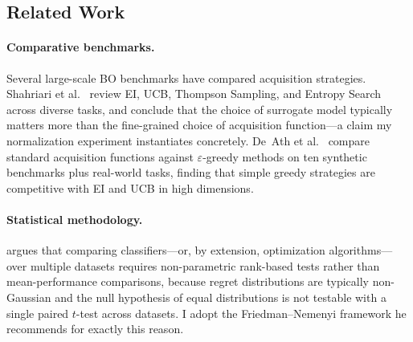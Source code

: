\subsection{Related Work}
\label{sec:related}

\paragraph{Comparative benchmarks.}
Several large-scale BO benchmarks have compared acquisition strategies.
Shahriari et al.~\citeyear{shahriari2016taking} review EI, UCB,
Thompson Sampling, and Entropy Search across diverse tasks, and conclude
that the choice of surrogate model typically matters more than the
fine-grained choice of acquisition function—a claim my normalization
experiment instantiates concretely.
De~Ath et al.~\citeyear{deAth2019greed} compare standard acquisition
functions against $\varepsilon$-greedy methods on ten synthetic benchmarks plus
real-world tasks, finding that simple greedy strategies are competitive
with EI and UCB in high dimensions.

\paragraph{Statistical methodology.}
 argues that comparing classifiers—or, by
extension, optimization algorithms—over multiple datasets requires
non-parametric rank-based tests rather than mean-performance
comparisons, because regret distributions are typically non-Gaussian and
the null hypothesis of equal distributions is not testable with a single
paired $t$-test across datasets.
I adopt the Friedman–Nemenyi framework he recommends for exactly this
reason.
